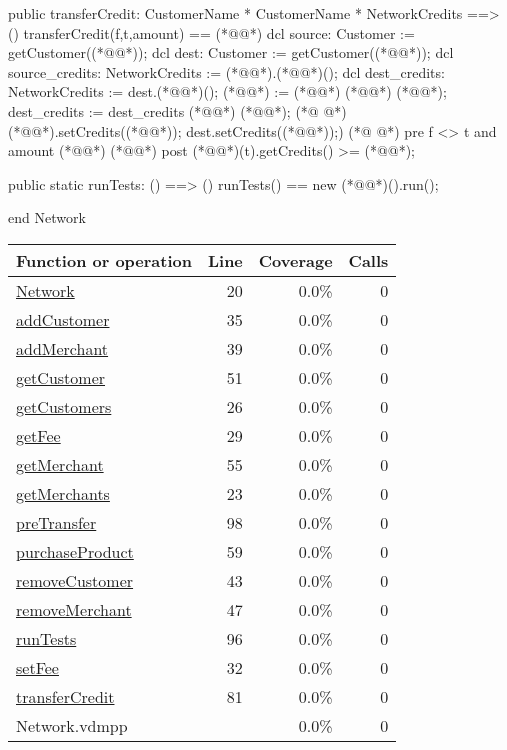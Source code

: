 \begin{vdmpp}[breaklines=true]
 public transferCredit: CustomerName * CustomerName * NetworkCredits ==> ()
 transferCredit(f,t,amount) == (*@\vdmnotcovered{(}@*)
  dcl source: Customer := getCustomer((*@@*));
  dcl dest: Customer := getCustomer((*@@*));
  dcl source_credits: NetworkCredits := (*@@*).(*@@*)();
  dcl dest_credits: NetworkCredits := dest.(*@@*)();
  (*@@*) := (*@@*) (*@\vdmnotcovered{-}@*) (*@@*);
  dest_credits := dest_credits (*@\vdmnotcovered{+}@*) (*@@*);
(*@
\label{runTests:96}
@*)
  (*@@*).setCredits((*@@*));
  dest.setCredits((*@@*));)
(*@
\label{preTransfer:98}
@*)
  pre f <> t and amount (*@\vdmnotcovered{>=}@*) (*@@*)
  post (*@@*)(t).getCredits() >= (*@@*);
 
 public static runTests: () ==> ()
 runTests() == new (*@@*)().run(); 
 
end Network
\end{vdmpp}
\bigskip
\begin{longtable}{|l|r|r|r|}
\hline
Function or operation & Line & Coverage & Calls \\
\hline
\hline
\hyperref[Network:20]{Network} & 20&0.0\% & 0 \\
\hline
\hyperref[addCustomer:35]{addCustomer} & 35&0.0\% & 0 \\
\hline
\hyperref[addMerchant:39]{addMerchant} & 39&0.0\% & 0 \\
\hline
\hyperref[getCustomer:51]{getCustomer} & 51&0.0\% & 0 \\
\hline
\hyperref[getCustomers:26]{getCustomers} & 26&0.0\% & 0 \\
\hline
\hyperref[getFee:29]{getFee} & 29&0.0\% & 0 \\
\hline
\hyperref[getMerchant:55]{getMerchant} & 55&0.0\% & 0 \\
\hline
\hyperref[getMerchants:23]{getMerchants} & 23&0.0\% & 0 \\
\hline
\hyperref[preTransfer:98]{preTransfer} & 98&0.0\% & 0 \\
\hline
\hyperref[purchaseProduct:59]{purchaseProduct} & 59&0.0\% & 0 \\
\hline
\hyperref[removeCustomer:43]{removeCustomer} & 43&0.0\% & 0 \\
\hline
\hyperref[removeMerchant:47]{removeMerchant} & 47&0.0\% & 0 \\
\hline
\hyperref[runTests:96]{runTests} & 96&0.0\% & 0 \\
\hline
\hyperref[setFee:32]{setFee} & 32&0.0\% & 0 \\
\hline
\hyperref[transferCredit:81]{transferCredit} & 81&0.0\% & 0 \\
\hline
\hline
Network.vdmpp & & 0.0\% & 0 \\
\hline
\end{longtable}

